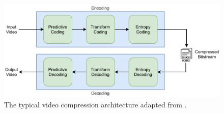 \begin{figure}[!htbp]
  \centering
  \includegraphics[width=0.8\linewidth]{img/comp_architecture.pdf}
  \caption[The typical video compression architecture]
  {
  The typical video compression architecture adapted from \cite{zhang_overview_2019}.
  }
  \label{fig:comp_architecture}
\end{figure}